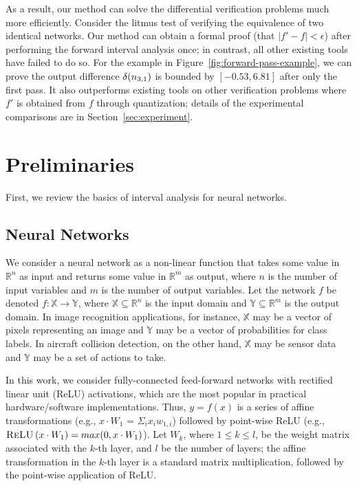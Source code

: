 As a result, our method can solve the differential verification
problems much more efficiently.  Consider the litmus test of verifying the
equivalence of two identical networks.  Our method can obtain a formal
proof (that $|f'-f|<\epsilon$) after performing the forward interval
analysis once; in contrast, all other existing tools have failed to do
so.
%
For the example in Figure~\ref{fig:forward-pass-example}, we can prove
the output difference $\delta(n_{3,1})$ is bounded by $[-0.53,
6.81]$ after only the first pass.
%
It also outperforms existing tools on other verification problems
where $f'$ is obtained from $f$ through quantization; details of the
experimental comparisons are in Section~\ref{sec:experiment}.


\section{Preliminaries}
\label{sec:prelims}

First, we review the basics of interval analysis for neural networks.


\subsection{Neural Networks}

We consider a neural network as a non-linear function that takes some
value in $\mathbb{R}^n$ as input and returns some value in
$\mathbb{R}^m$ as output, where $n$ is the number of input variables
and $m$ is the number of output variables.
%
Let the network $ f $ be denoted $f: \mathbb{X} \to \mathbb{Y}$, where
$\mathbb{X} \subseteq \mathbb{R}^n$ is the input domain and
$ \mathbb{Y} \subseteq \mathbb{R}^m $ is the output domain.
%
In image recognition applications, for instance, $\mathbb{X}$ may be a vector of pixels representing an image and
$\mathbb{Y}$ may be a vector of probabilities for class labels.  In
aircraft collision detection, on the other hand, $\mathbb{X}$ may be
sensor data and $\mathbb{Y}$ may be a set of actions to take.


In this work, we consider fully-connected feed-forward networks with
rectified linear unit (ReLU) activations, which are the most popular
in practical hardware/software implementations.
%
Thus, $y = f(x)$ is a series of affine transformations (e.g., $x \cdot
W_1$ = $\Sigma_i x_i w_{1,i}$) followed by point-wise ReLU (e.g.,
$\textsc{ReLU}\left(x\cdot W_1\right) = max(0, x\cdot W_1)$).
%
Let $W_k$, where $1 \leq k \leq l$, be the weight matrix associated
with the $k$-th layer, and $l$ be the number of layers; the affine
transformation in the $k$-th layer is a standard matrix
multiplication, followed by the point-wise application of ReLU.


